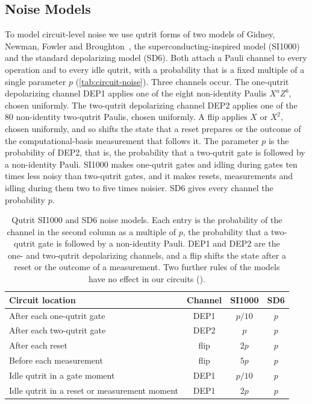 \subsection{Noise Models}
\label{sub:noise_models}

To model circuit-level noise we use qutrit forms of two models of Gidney, Newman, Fowler and Broughton~\cite{GidneyHoneycomb2021}, the superconducting-inspired model (SI1000) and the standard depolarizing model (SD6). Both attach a Pauli channel to every operation and to every idle qutrit, with a probability that is a fixed multiple of a single parameter $p$ (\autoref{tab:circuit-noise}). Three channels occur. The one-qutrit depolarizing channel DEP1 applies one of the eight non-identity Paulis $X^a Z^b$, chosen uniformly. The two-qutrit depolarizing channel DEP2 applies one of the $80$ non-identity two-qutrit Paulis, chosen uniformly. A flip applies $X$ or $X^2$, chosen uniformly, and so shifts the state that a reset prepares or the outcome of the computational-basis measurement that follows it. The parameter $p$ is the probability of DEP2, that is, the probability that a two-qutrit gate is followed by a non-identity Pauli. SI1000 makes one-qutrit gates and idling during gates ten times less noisy than two-qutrit gates, and it makes resets, measurements and idling during them two to five times noisier. SD6 gives every channel the probability $p$.

\begin{table}[tp]
  \centering
  \begin{tabular}{l|c|c|c}
    \hline
    Circuit location & Channel & SI1000 & SD6 \\
    \hline
    After each one-qutrit gate & DEP1 & $p/10$ & $p$ \\
    After each two-qutrit gate & DEP2 & $p$ & $p$ \\
    After each reset & flip & $2p$ & $p$ \\
    Before each measurement & flip & $5p$ & $p$ \\
    Idle qutrit in a gate moment & DEP1 & $p/10$ & $p$ \\
    Idle qutrit in a reset or measurement moment & DEP1 & $2p$ & $p$ \\
    \hline
  \end{tabular}
  \caption{Qutrit SI1000 and SD6 noise models. Each entry is the probability of the channel in the second column as a multiple of $p$, the probability that a two-qutrit gate is followed by a non-identity Pauli. DEP1 and DEP2 are the one- and two-qutrit depolarizing channels, and a flip shifts the state after a reset or the outcome of a measurement. Two further rules of the models have no effect in our circuits ().}
  \label{tab:circuit-noise}
\end{table}

